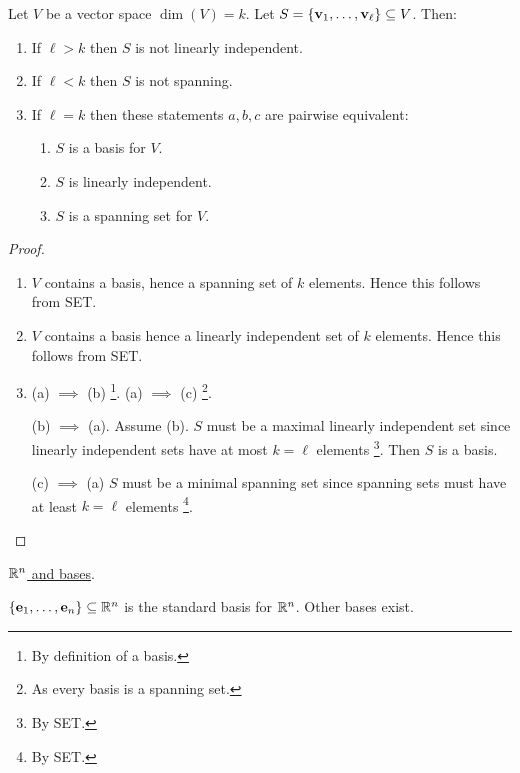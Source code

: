 \documentclass[10pt, a4paper]{article}
\begin{document}
\begin{theorem}
    Let $V$ be a vector space $\dim(V) = k$.
    Let $S = \{\mathbf{v}_1, \dotsc, \mathbf{v}_{\ell}\} \subseteq V$.
    Then:
    \begin{enumerate}[label = (\roman*)]
        \item If $\ell > k$ then $S$ is not linearly independent.
        \item If $\ell < k$ then $S$ is not spanning.
        \item If $\ell = k$ then these statements $a, b, c$ are pairwise equivalent:
        \begin{enumerate}[label = (\alph*)]
            \item $S$ is a basis for $V$.
            \item $S$ is linearly independent.
            \item $S$ is a spanning set for $V$.
        \end{enumerate}
    \end{enumerate}
    \begin{proof}
        \begin{enumerate}[label = (\roman*)]
            \item $V$ contains a basis,
            hence a spanning set of $k$ elements.
            Hence this follows from SET.
            \item $V$ contains a basis hence a linearly independent set of $k$ elements.
            Hence this follows from SET.
            \item (a) $\implies$ (b)
            \footnote{By definition of a basis.}.
            (a) $\implies$ (c)
            \footnote{As every basis is a spanning set.}.

            (b) $\implies$ (a).
            Assume (b).
            $S$ must be a maximal linearly independent set
            since linearly independent sets have at most $k = \ell$ elements
            \footnote{By SET.}.
            Then $S$ is a basis.

            (c) $\implies$ (a)
            $S$ must be a minimal spanning set since spanning sets must have at least $k = \ell$ elements
            \footnote{By SET.}.
        \end{enumerate}
    \end{proof}
\end{theorem}

\underline{$\mathbb{R} ^ n$ and bases}.

$\{\mathbf{e}_1, \dotsc, \mathbf{e}_n\} \subseteq \mathbb{R} ^ n$ is the standard basis for $\mathbb{R} ^ n$.
Other bases exist.
\end{document}
